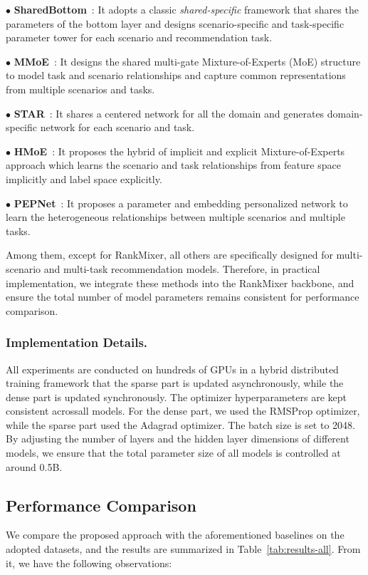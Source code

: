$\bullet$ \textbf{SharedBottom}~\cite{sharedbottom}: It adopts a classic \emph{shared-specific} framework that shares the parameters of the bottom layer and designs scenario-specific and task-specific parameter tower for each scenario and recommendation task.

$\bullet$ \textbf{MMoE}~\cite{MMoE}: It designs the shared multi-gate Mixture-of-Experts (MoE) structure to model task and scenario relationships and capture common representations from multiple scenarios and tasks.

$\bullet$ \textbf{STAR}~\cite{STAR}: It shares a centered network for all the domain and generates domain-specific network for each scenario and task.

$\bullet$ \textbf{HMoE}~\cite{HMoE}: It proposes the hybrid of implicit and explicit Mixture-of-Experts approach which learns the scenario and task relationships from feature space implicitly and label space explicitly.

$\bullet$ \textbf{PEPNet}~\cite{PEPNet}: It proposes a parameter and embedding personalized network to learn the heterogeneous relationships between multiple scenarios and multiple tasks.

Among them, except for RankMixer, all others are specifically designed for multi-scenario and multi-task recommendation models.
Therefore, in practical implementation, we integrate these methods into the RankMixer backbone, and ensure the total number of model parameters remains consistent for performance comparison.

\subsubsection{Implementation Details.}
All experiments are conducted on hundreds of GPUs in a hybrid distributed training framework that the sparse part is updated asynchronously, while the dense part is updated synchronously.
The optimizer hyperparameters are kept consistent acrossall models.
For the dense part, we used the RMSProp optimizer, while the sparse part used the Adagrad optimizer.
The batch size is set to 2048.
By adjusting the number of layers and the hidden layer dimensions of different models, we ensure that the total parameter size of all models is controlled at around 0.5B.

\subsection{Performance Comparison}
We compare the proposed approach with the aforementioned baselines on the adopted datasets, and the results are summarized in Table~\ref{tab:results-all}.
From it, we have the following observations:

